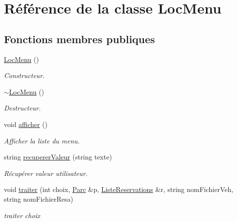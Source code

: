 \hypertarget{class_loc_menu}{
\section{Référence de la classe LocMenu}
\label{class_loc_menu}
}
\subsection*{Fonctions membres publiques}
\begin{DoxyCompactItemize}
\item 
\hyperlink{class_loc_menu_a8a5ba1025bf18ae8f7b103517f87d057}{LocMenu} ()
\begin{DoxyCompactList}\small\item\em Constructeur. \item\end{DoxyCompactList}\item 
\hyperlink{class_loc_menu_ad4f2fe2ed5d7789908649301102f2dc3}{$\sim$LocMenu} ()
\begin{DoxyCompactList}\small\item\em Destructeur. \item\end{DoxyCompactList}\item 
void \hyperlink{class_loc_menu_aef44c96ab96e7cfb155a39c01a24c32e}{afficher} ()
\begin{DoxyCompactList}\small\item\em Afficher la liste du menu. \item\end{DoxyCompactList}\item 
string \hyperlink{class_loc_menu_aec95d16c95fb328c8306884417be6b4a}{recupererValeur} (string texte)
\begin{DoxyCompactList}\small\item\em Récupérer valeur utilisateur. \item\end{DoxyCompactList}\item 
void \hyperlink{class_loc_menu_a39ea93ab3e1fbca88093550c7f058220}{traiter} (int choix, \hyperlink{class_parc}{Parc} \&p, \hyperlink{class_liste_reservations}{ListeReservations} \&r, string nomFichierVeh, string nomFichierResa)
\begin{DoxyCompactList}\small\item\em traiter choix \item\end{DoxyCompactList}\end{DoxyCompactItemize}


